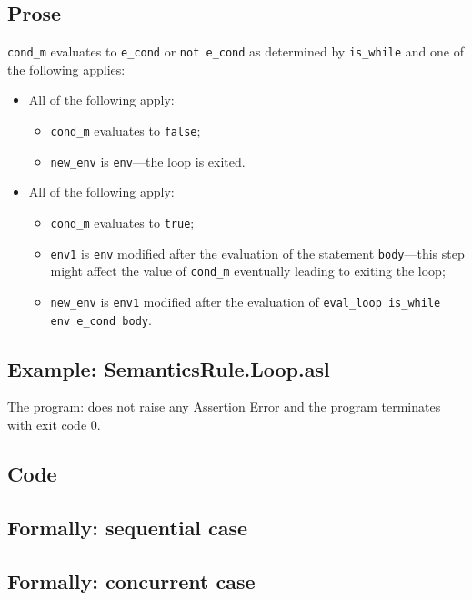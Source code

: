 \documentclass{book}
\begin{document}
    \subsection{Prose}
    \texttt{cond\_m} evaluates to \texttt{e\_cond} or \texttt{not e\_cond} as
determined by \texttt{is\_while} and one of the following applies:
    \begin{itemize}
    \item All of the following apply:
      \begin{itemize}
      \item \texttt{cond\_m} evaluates to \texttt{false};
      \item \texttt{new\_env} is \texttt{env}---the loop is exited.
      \end{itemize}
    \item All of the following apply:
      \begin{itemize}
      \item \texttt{cond\_m} evaluates to \texttt{true};
      \item \texttt{env1} is \texttt{env} modified after the evaluation of the
statement \texttt{body}---this step might affect the value of \texttt{cond\_m}
eventually leading to exiting the loop;
      \item \texttt{new\_env} is \texttt{env1} modified after the evaluation of
\texttt{eval\_loop is\_while env e\_cond body}.
      \end{itemize}
    \end{itemize}

    \subsection{Example: SemanticsRule.Loop.asl}
    The program:
    does not raise any Assertion Error and the program terminates with exit
    code 0.

    \subsection{Code}

\begin{emptyformal}
    \subsection{Formally: sequential case}

  \subsection{Formally: concurrent case}
\end{emptyformal}
\end{document}
